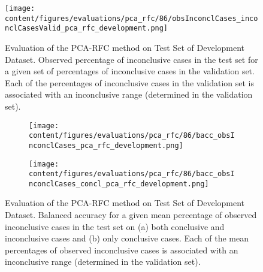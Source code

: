 \begin{figure}[h]
  \centering
  \texttt{[image: content/figures/evaluations/pca\_rfc/86/obsInconclCases\_inconclCasesValid\_pca\_rfc\_development.png]}
  \caption{Evaluation of the PCA-RFC method on Test Set of Development Dataset.
  Observed percentage of inconclusive cases in the test set 
  for a given set of percentages of inconclusive cases in the validation set.
  Each of the percentages of inconclusive cases in the validation set is associated 
  with an inconclusive range (determined in the validation set).} 
  \label{fig:obsInconclCases_inconclCasesValid_pca_rfc_development}
\end{figure} 


\begin{figure}[t]
  \begin{subfigure}{0.9\textwidth}
    \centering
    \texttt{[image: content/figures/evaluations/pca\_rfc/86/bacc\_obsInconclCases\_pca\_rfc\_development.png]}
    \subcaption{}
    \label{fig:bacc_obsInconclCases_pca_rfc_development}
  \end{subfigure}
  \hfill
  \begin{subfigure}{0.9\textwidth}
    \centering
    \texttt{[image: content/figures/evaluations/pca\_rfc/86/bacc\_obsInconclCases\_concl\_pca\_rfc\_development.png]}
    \subcaption{}
    \label{fig:bacc_obsInconclCases_concl_pca_rfc_development}
  \end{subfigure}

  \caption{Evaluation of the PCA-RFC method on Test Set of Development Dataset.
  Balanced accuracy for a given mean percentage of observed inconclusive cases in the test set on 
  (a) both conclusive and inconclusive cases and (b) only conclusive cases. 
  Each of the mean percentages of observed inconclusive cases is associated with an inconclusive range (determined in the validation set). }
  \label{fig:bacc_obsInconclCases_pca_rfc_development_full}
\end{figure}




